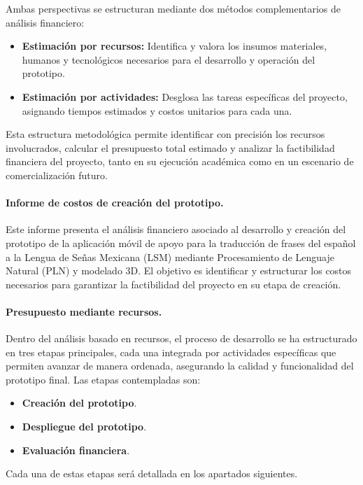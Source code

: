 Ambas perspectivas se estructuran mediante dos métodos complementarios de análisis financiero:

\begin{itemize}
	\item \textbf{Estimación por recursos:} Identifica y valora los insumos materiales, humanos y tecnológicos necesarios para el desarrollo y operación del prototipo.
	\item \textbf{Estimación por actividades:} Desglosa las tareas específicas del proyecto, asignando tiempos estimados y costos unitarios para cada una.
\end{itemize}

Esta estructura metodológica permite identificar con precisión los recursos involucrados, calcular el presupuesto total estimado y analizar la factibilidad financiera del proyecto, tanto en su ejecución académica como en un escenario de comercialización futuro.

\paragraph{\textbf{Informe de costos de creación del prototipo.}} 
Este informe presenta el análisis financiero asociado al desarrollo y creación del prototipo de la aplicación móvil de apoyo para la traducción de frases del español a la Lengua de Señas Mexicana (LSM) mediante Procesamiento de Lenguaje Natural (PLN) y modelado 3D. El objetivo es identificar y estructurar los costos necesarios para garantizar la factibilidad del proyecto en su etapa de creación.

\paragraph{\textbf{Presupuesto mediante recursos.}} 
Dentro del análisis basado en recursos, el proceso de desarrollo se ha estructurado en tres etapas principales, cada una integrada por actividades específicas que permiten avanzar de manera ordenada, asegurando la calidad y funcionalidad del prototipo final. Las etapas contempladas son:

\begin{itemize}
	\item \textbf{Creación del prototipo}. 
	\item \textbf{Despliegue del prototipo}.
	\item \textbf{Evaluación financiera}. 
\end{itemize}

Cada una de estas etapas será detallada en los apartados siguientes.

